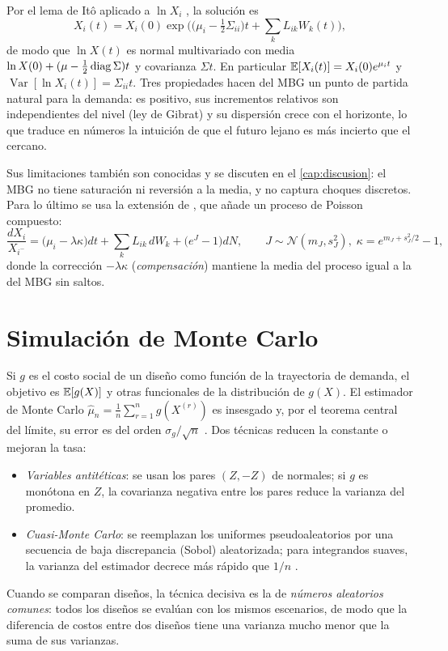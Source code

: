Por el lema de Itô aplicado a $\ln X_i$ \citep{oksendal2003}, la solución es
\begin{equation}\label{eq:mbg_sol}
X_i(t)=X_i(0)\exp\!\Big(\big(\mu_i-\tfrac12\Sigma_{ii}\big)t+\textstyle\sum_k L_{ik}W_k(t)\Big),
\end{equation}
de modo que $\ln X(t)$ es normal multivariado con media $\ln X(0)+(\mu-\tfrac12\operatorname{diag}\Sigma)t$ y
covarianza $\Sigma t$. En particular $\mathbb{E}[X_i(t)]=X_i(0)e^{\mu_i t}$ y
$\operatorname{Var}[\ln X_i(t)]=\Sigma_{ii}t$. Tres propiedades hacen del MBG un punto de partida
natural para la demanda: es positivo, sus incrementos relativos son independientes del nivel (ley de
Gibrat) y su dispersión crece con el horizonte, lo que traduce en números la intuición de que el
futuro lejano es más incierto que el cercano.

Sus limitaciones también son conocidas y se discuten en el \cref{cap:discusion}: el MBG no tiene
saturación ni reversión a la media, y no captura choques discretos. Para lo último se usa la extensión
de \citet{merton1976}, que añade un proceso de Poisson compuesto:
\begin{equation}\label{eq:merton}
\frac{dX_i}{X_{i^-}}=\big(\mu_i-\lambda\kappa\big)dt+\sum_k L_{ik}\,dW_k+\big(e^{J}-1\big)dN,
\qquad J\sim\mathcal N(m_J,s_J^2),\;\kappa=e^{m_J+s_J^2/2}-1,
\end{equation}
donde la corrección $-\lambda\kappa$ (\emph{compensación}) mantiene la media del proceso igual a la del
MBG sin saltos.

\section{Simulación de Monte Carlo}

Si $g$ es el costo social de un diseño como función de la trayectoria de demanda, el objetivo es
$\mathbb{E}[g(X)]$ y otras funcionales de la distribución de $g(X)$. El estimador de Monte Carlo
$\hat\mu_n=\frac1n\sum_{r=1}^n g(X^{(r)})$ es insesgado y, por el teorema central del límite, su error
es del orden $\sigma_g/\sqrt n$ \citep{glasserman2004}. Dos técnicas reducen la constante o mejoran la
tasa:
\begin{itemize}[nosep]
\item \emph{Variables antitéticas}: se usan los pares $(Z,-Z)$ de normales; si $g$ es monótona en $Z$,
      la covarianza negativa entre los pares reduce la varianza del promedio.
\item \emph{Cuasi-Monte Carlo}: se reemplazan los uniformes pseudoaleatorios por una secuencia de baja
      discrepancia (Sobol) aleatorizada; para integrandos suaves, la varianza del estimador decrece más
      rápido que $1/n$ \citep{owen1997}.
\end{itemize}
Cuando se comparan diseños, la técnica decisiva es la de \emph{números aleatorios comunes}: todos los
diseños se evalúan con los mismos escenarios, de modo que la diferencia de costos entre dos diseños
tiene una varianza mucho menor que la suma de sus varianzas.

